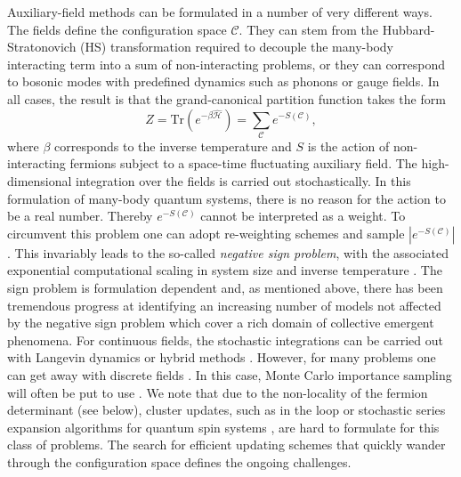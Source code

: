 Auxiliary-field methods  can be formulated in a number of very different ways.  The fields define  the  configuration space $\mathcal{C}$. They can stem from the Hubbard-Stratonovich (HS)  \cite{Hubbard59} transformation required to decouple the  many-body interacting term into a sum of non-interacting problems,  or they can correspond to  bosonic modes with predefined dynamics such as phonons or gauge fields. In all cases, the result is that  the grand-canonical partition function  takes the form
\begin{equation}
	 Z = \text{Tr}\left( e^{-\beta \hat{\mathcal{H}}}\right)   =   \sum_{\mathcal{C}} e^{-S(\mathcal{C}) },
\end{equation}
where $\beta $ corresponds to the inverse temperature and $S$  is the action of non-interacting fermions subject to a  space-time fluctuating auxiliary field.    
The high-dimensional  integration  over the fields is carried out stochastically.  In this formulation of many-body quantum systems, there is no reason for the action to be a real number.  Thereby $e^{-S(\mathcal{C})}$ cannot be interpreted as a weight. To circumvent this problem one can adopt   re-weighting schemes and sample $| e^{-S(\mathcal{C})}| $. This invariably leads to the so-called \emph{negative sign problem}, with the associated exponential computational scaling in system size and inverse temperature \cite{Troyer05}.  The sign problem is formulation dependent and, as mentioned above, there has been tremendous progress at identifying an increasing number of models not affected by the negative sign problem which cover a rich domain of collective emergent phenomena.  
For continuous fields, the stochastic integrations can  be carried out with Langevin  dynamics or hybrid methods \cite{Duane85}.   However, for many  problems one can get away with discrete fields \cite{Hirsch83}. In this case,  Monte Carlo importance sampling will often be put to use \cite{Sokal89}.  
We note that  due to  the non-locality of the fermion determinant (see below), cluster updates,  such as in the loop or stochastic series expansion algorithms for quantum spin systems  \cite{Evertz93,Sandvik99b,Sandvik02}, are hard to formulate for this class of problems.  The search for efficient updating schemes that quickly wander through the configuration space defines the ongoing challenges. 

